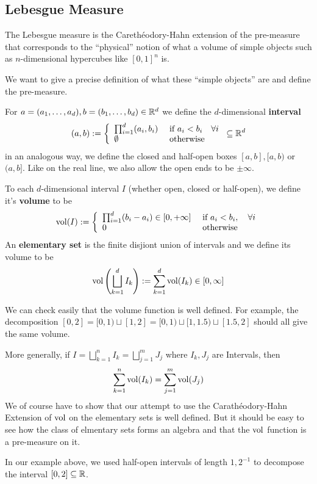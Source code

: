 \subsection{Lebesgue Measure}
The Lebesgue measure is the Carethéodory-Hahn extension of the pre-measure that corresponds to the ``physical'' notion of what a volume of simple objects such as $n$-dimensional hypercubes like $[0,1]^{n}$ is.

We want to give a precise definition of what these ``simple objects'' are and define the pre-measure.
\begin{dfn}[]
  For $a = (a_{1}, \ldots, a_{d}), b = (b_{1}, \ldots, b_{d}) \in \mathbb{R}^{d}$ we define the $d$-dimensional \textbf{interval}
  \begin{align*}
    (a,b)
    :=
    \left\{\begin{array}{ll}
        \prod_{i=1}^{d}(a_i,b_i) & \text{ if } a_i < b_i \quad \forall i\\
       \emptyset & \text{ otherwise}
    \end{array} \right.
    \subseteq \mathbb{R}^{d}
  \end{align*}
  in an analogous way, we define the closed and half-open boxes $[a,b], [a,b)$ or $(a,b]$.
  Like on the real line, we also allow the open ends to be $\pm \infty$.

  To each $d$-dimensional interval $I$ (whether open, closed or half-open), we define it's \textbf{volume} to be
  \begin{align*}
    \operatorname{vol}(I) :=
    \left\{\begin{array}{ll}
    \prod_{i=1}^{d}(b_i - a_i) \in [0,+\infty] 
       &
    \text{ if } a_i < b_i, \quad \forall i
       \\
      0 & \text{ otherwise}
    \end{array} \right.
  \end{align*}
  An \textbf{elementary set} is the finite disjiont union of intervals and we define its volume to be 
  \begin{align*}
    \operatorname{vol}\left(
      \bigsqcup_{k=1}^{d}I_k 
    \right)
      :=
      \sum_{k=1}^{d}\operatorname{vol}(I_k) \in [0,\infty]
  \end{align*}
\end{dfn}


\begin{rem}[]
  We can check easily that the volume function is well defined.
  For example, the decomposition $[0,2] = [0,1) \sqcup [1,2] = [0,1) \sqcup [1,1.5) \sqcup [1.5,2]$ should all give the same volume.

  More generally, if $I= \bigsqcup_{k=1}^{n}I_k = \bigsqcup_{j=1}^m J_j$ where $I_k,J_j$ are Intervals, then
  \begin{align*}
    \sum_{k=1}^{n}\operatorname{vol}(I_k) = \sum_{j=1}^{m} \operatorname{vol}(J_j)
  \end{align*}
  We of course have to show that our attempt to use the Carathéodory-Hahn Extension of $\operatorname{vol}$ on the elementary sets is well defined. 
  But it should be easy to see how the class of elmentary sets forms an algebra and that the $\operatorname{vol}$ function is a pre-measure on it.
\end{rem}
In our example above, we used half-open intervals of length $1, 2^{-1}$ to decompose the interval $[0,2] \subseteq \mathbb{R}$.

